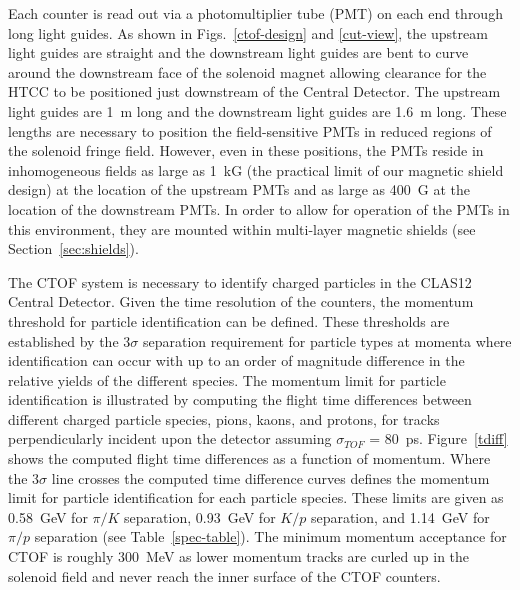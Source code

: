\documentclass[3p,times,twocolumn]{elsarticle}
\begin{document}
Each counter is read out via a photomultiplier tube (PMT) on each end through long light guides. As shown in
Figs.~\ref{ctof-design} and \ref{cut-view}, the upstream light guides are straight and the downstream light
guides are bent to curve around the downstream face of the solenoid magnet allowing clearance for the HTCC
to be positioned just downstream of the Central Detector. The upstream light guides are 1~m long and the
downstream light guides are 1.6~m long. These lengths are necessary to position the field-sensitive PMTs in
reduced regions of the solenoid fringe field. However, even in these positions, the PMTs reside in
inhomogeneous fields as large as 1~kG (the practical limit of our magnetic shield design) at the location of the
upstream PMTs and as large as 400~G at the location of the downstream PMTs. In order to allow for operation
of the PMTs in this environment, they are mounted within multi-layer magnetic shields (see
Section~\ref{sec:shields}).

The CTOF system is necessary to identify charged particles in the CLAS12 Central Detector. Given the
time resolution of the counters, the momentum threshold for particle identification can be defined. These
thresholds are established by the 3$\sigma$ separation requirement for particle types at momenta where
identification can occur with up to an order of magnitude difference in the relative yields of the different
species. The momentum limit for particle identification is illustrated by computing the flight time
differences between different charged particle species, pions, kaons, and protons, for tracks perpendicularly
incident upon the detector assuming $\sigma_{TOF}$ = 80~ps. Figure~\ref{tdiff} shows the computed flight
time differences as a function of momentum. Where the 3$\sigma$ line crosses the computed time difference
curves defines the momentum limit for particle identification for each particle species. These limits are given
as 0.58~GeV for $\pi/K$ separation, 0.93~GeV for $K/p$ separation, and 1.14~GeV for $\pi/p$ separation
(see Table~\ref{spec-table}). The minimum momentum acceptance for CTOF is roughly 300~MeV as lower
momentum tracks are curled up in the solenoid field and never reach the inner surface of the CTOF counters.
\end{document}
